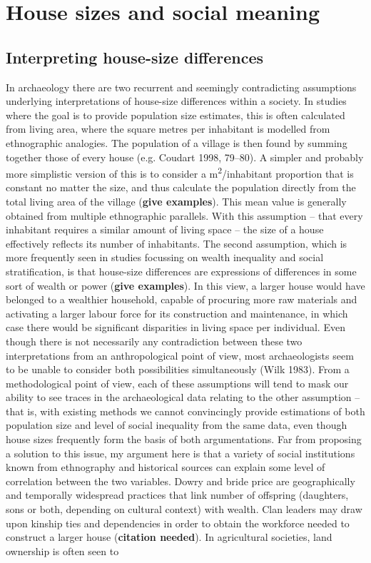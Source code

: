 \documentclass[
  12pt,
  a4paper, twoside]{book}
\begin{document}
\hypertarget{house-sizes-theory}{%
\chapter{House sizes and social meaning}\label{house-sizes-theory}}

\hypertarget{house-sizes-ethno}{%
\section{Interpreting house-size differences}\label{house-sizes-ethno}}

In archaeology there are two recurrent and seemingly contradicting assumptions underlying interpretations of house-size differences within a society. In studies where the goal is to provide population size estimates, this is often calculated from living area, where the square metres per inhabitant is modelled from ethnographic analogies. The population of a village is then found by summing together those of every house (e.g. Coudart 1998, 79--80). A simpler and probably more simplistic version of this is to consider a m\textsuperscript{2}/inhabitant proportion that is constant no matter the size, and thus calculate the population directly from the total living area of the village (\textbf{give examples}). This mean value is generally obtained from multiple ethnographic parallels. With this assumption -- that every inhabitant requires a similar amount of living space -- the size of a house effectively reflects its number of inhabitants. The second assumption, which is more frequently seen in studies focussing on wealth inequality and social stratification, is that house-size differences are expressions of differences in some sort of wealth or power (\textbf{give examples}). In this view, a larger house would have belonged to a wealthier household, capable of procuring more raw materials and activating a larger labour force for its construction and maintenance, in which case there would be significant disparities in living space per individual. Even though there is not necessarily any contradiction between these two interpretations from an anthropological point of view, most archaeologists seem to be unable to consider both possibilities simultaneously (Wilk 1983). From a methodological point of view, each of these assumptions will tend to mask our ability to see traces in the archaeological data relating to the other assumption -- that is, with existing methods we cannot convincingly provide estimations of both population size and level of social inequality from the same data, even though house sizes frequently form the basis of both argumentations. Far from proposing a solution to this issue, my argument here is that a variety of social institutions known from ethnography and historical sources can explain some level of correlation between the two variables. Dowry and bride price are geographically and temporally widespread practices that link number of offspring (daughters, sons or both, depending on cultural context) with wealth. Clan leaders may draw upon kinship ties and dependencies in order to obtain the workforce needed to construct a larger house (\textbf{citation needed}). In agricultural societies, land ownership is often seen to 
\end{document}
